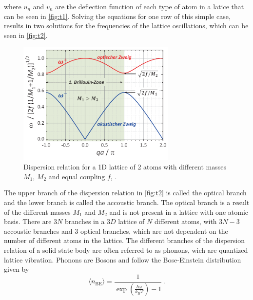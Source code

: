 where $u_n$ and $v_n$ are the deflection function of each type of atom in a latice that can be seen in \autoref{fig:t1}.
Solving the equations for one row of this simple case, results in two solutions for the frequencies of the lattice oscillations, which can be seen in \autoref{fig:t2}.
\begin{figure}[H]
    \centering
    \includegraphics[width=0.7\textwidth]{dispersion.pdf}
    \caption{Dispersion relation for a 1D lattice of 2 atoms with different masses $M_1$, $M_2$ and equal coupling $f$, \cite{rehab}.}
    \label{fig:t2}
\end{figure}
\noindent
The upper branch of the dispersion relation in \autoref{fig:t2} is called the optical branch and the lower branch is called the accoustic branch. The optical branch is a result of the different masses $M_1$ and $M_2$ and is not present in a lattice with one atomic basis. There are $3N$ branches in a $3D$ lattice of $N$ different atoms, with $3N-3$ accoustic branches and $3$ optical branches, which are not dependent on the number of different atoms in the lattice.
The different branches of the dispersion relation of a solid state body are often referred to as phonons, wich are quantized lattice vibration. Phonons are Bosons and follow the Bose-Einstein distribution given by 
\begin{equation} 
    \label{eqn:t3}
    \langle n_\text{BE} \rangle = \frac{1}{\exp \left( \frac{\hbar \omega}{k_B T} \right) - 1} \, .
\end{equation}

